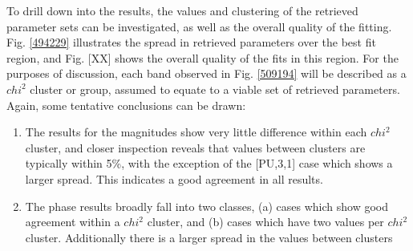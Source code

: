 To drill down into the results, the values and clustering of the retrieved parameter sets can be investigated, as well as the overall quality of the fitting. Fig. \ref{494229} illustrates the spread in retrieved parameters over the best fit region, and Fig. [XX] shows the overall quality of the fits in this region. For the purposes of discussion, each band observed in Fig. \ref{509194} will be described as a $chi^2$ cluster or group, assumed to equate to a viable set of retrieved parameters. Again, some tentative conclusions can be drawn:

\begin{enumerate}
\item The results for the magnitudes show very little difference within each $chi^2$ cluster, and closer inspection reveals that values between clusters are typically within 5\%, with the exception of the [PU,3,1] case which shows a larger spread. This indicates a good agreement in all results.
\item The phase results broadly fall into two classes, (a) cases which show good agreement within a $chi^2$ cluster, and (b) cases which have two values per $chi^2$ cluster. Additionally there is a larger spread in the values between clusters
\end{enumerate}




